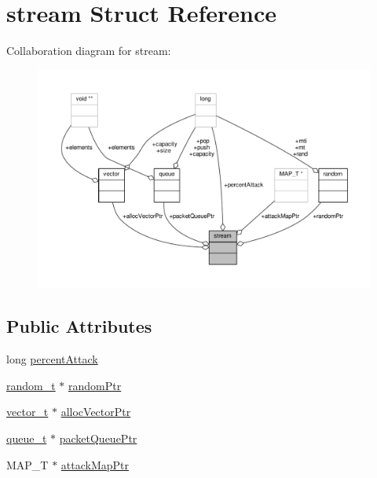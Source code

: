 \hypertarget{structstream}{\section{stream Struct Reference}
\label{structstream}
}


Collaboration diagram for stream\-:
\nopagebreak
\begin{figure}[H]
\begin{center}
\leavevmode
\includegraphics[width=350pt]{structstream__coll__graph}
\end{center}
\end{figure}
\subsection*{Public Attributes}
\begin{DoxyCompactItemize}
\item 
long \hyperlink{structstream_a7842c8d3613adca432a61130c3a6105c}{percent\-Attack}
\item 
\hyperlink{rstm_2rstm-dev_2stamp-0_89_810_2lib_2random_8h_af410e652a1bc8f802b0da971e8b87fad}{random\-\_\-t} $\ast$ \hyperlink{structstream_a0d612b10b3697fe9724c27b6ef7afb57}{random\-Ptr}
\item 
\hyperlink{vector_8h_a5a1bca6fa9a3f18a2897623094d918da}{vector\-\_\-t} $\ast$ \hyperlink{structstream_af28ece56457c8c880ec9f93f4afcdab8}{alloc\-Vector\-Ptr}
\item 
\hyperlink{queue_8h_aa8acf648f3b0c69d7e132fcc61dc58c7}{queue\-\_\-t} $\ast$ \hyperlink{structstream_a546cbbe55eafdb4fb3c3d46321064500}{packet\-Queue\-Ptr}
\item 
M\-A\-P\-\_\-\-T $\ast$ \hyperlink{structstream_af86f8412d49b6ef0ddedb94773fb2bc9}{attack\-Map\-Ptr}
\end{DoxyCompactItemize}


